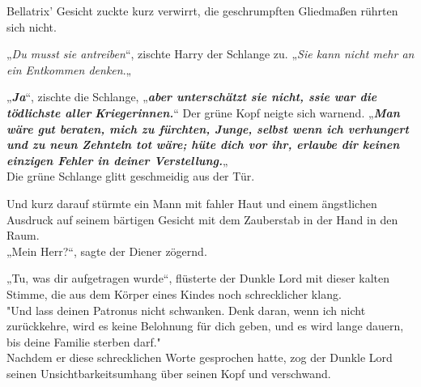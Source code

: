 {Bellatrix' Gesicht zuckte kurz verwirrt, die geschrumpften Gliedmaßen rührten sich nicht.

„\emph{Du musst sie antreiben}“, zischte Harry der Schlange zu. „\emph{Sie kann nicht mehr an ein Entkommen denken}.„

„\textbf{\emph{Ja}}“, zischte die Schlange, „\textbf{\emph{aber unterschätzt sie nicht, ssie war die tödlichste aller}} \textbf{\emph{Kriegerinnen.}}“ Der grüne Kopf neigte sich warnend. „\textbf{\emph{Man wäre gut beraten, mich zu fürchten, Junge, selbst wenn ich verhungert und zu neun Zehnteln tot wäre; hüte dich vor ihr, erlaube dir keinen einzigen Fehler in deiner Verstellung.}}„\\ Die grüne Schlange glitt geschmeidig aus der Tür.

Und kurz darauf stürmte ein Mann mit fahler Haut und einem ängstlichen Ausdruck auf seinem bärtigen Gesicht mit dem Zauberstab in der Hand in den Raum.\\ „Mein Herr?“, sagte der Diener zögernd.

„Tu, was dir aufgetragen wurde“, flüsterte der Dunkle Lord mit dieser kalten Stimme, die aus dem Körper eines Kindes noch schrecklicher klang.\\ "Und lass deinen Patronus nicht schwanken. Denk daran, wenn ich nicht zurückkehre, wird es keine Belohnung für dich geben, und es wird lange dauern, bis deine Familie sterben darf."\\ Nachdem er diese schrecklichen Worte gesprochen hatte, zog der Dunkle Lord seinen Unsichtbarkeitsumhang über seinen Kopf und verschwand.

}
